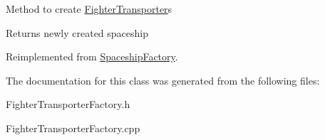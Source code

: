 Method to create \hyperlink{classFighterTransporter}{Fighter\+Transporter}\textquotesingle{}s \begin{DoxyReturn}{Returns}
newly created spaceship 
\end{DoxyReturn}


Reimplemented from \hyperlink{classSpaceshipFactory_a146f5e82385a55e9bf4ce63e28f99a9d}{Spaceship\+Factory}.



The documentation for this class was generated from the following files\+:\begin{DoxyCompactItemize}
\item 
Fighter\+Transporter\+Factory.\+h\item 
Fighter\+Transporter\+Factory.\+cpp\end{DoxyCompactItemize}
